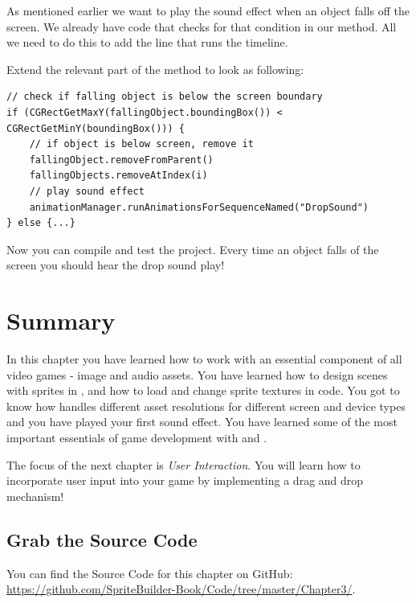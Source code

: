 As mentioned earlier we want to play the sound effect when an object falls off
the screen. We already have code that checks for that condition in our
 method. All we need to do this to add the line that runs the
timeline. 

\begin{leftbar}
Extend the relevant part of the  method to look as
following:
\begin{lstlisting}
// check if falling object is below the screen boundary
if (CGRectGetMaxY(fallingObject.boundingBox()) < CGRectGetMinY(boundingBox())) {
	// if object is below screen, remove it
    fallingObject.removeFromParent()
    fallingObjects.removeAtIndex(i)
    // play sound effect
    animationManager.runAnimationsForSequenceNamed("DropSound")
} else {...}
\end{lstlisting}
\end{leftbar}

Now you can compile and test the project. Every time an object falls of the
screen you should hear the drop sound play!

\section{Summary}
In this chapter you have learned how to work with an essential component of all
video games - image and audio assets. You have learned how to design scenes with
sprites in \SB{}, and how to load and change sprite textures in code. You got to
know how \SB{} handles different asset resolutions for different screen and
device types and you have played your first sound effect. You have learned some
of the most important essentials of game development with \SB{} and \cocos{}.

The focus of the next chapter is \textit{User Interaction}. You will learn how
to incorporate user input into your game by implementing a drag and drop
mechanism!

\subsection{Grab the Source Code}
You can find the Source Code for this chapter on GitHub:
\url{https://github.com/SpriteBuilder-Book/Code/tree/master/Chapter3/}.